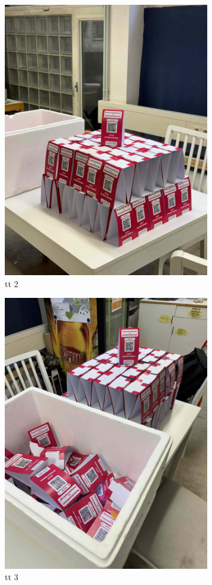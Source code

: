 \begin{multicols}{3}
\begin{figure}[H]
        \includegraphics[width=0.8\textwidth]{Content/Images/tt_02.jpg}
        \caption{\gls{tt} 2}
        \label{fig:table-tent2}
    \end{figure}
    \columnbreak
    \begin{figure}[H]
        \vspace{0.3\textwidth}
        \includegraphics[width=0.8\textwidth]{Content/Images/tt_03.jpg}
        \caption{\gls{tt} 3}
        \label{fig:table-tent3}
    \end{figure}
\end{multicols}

